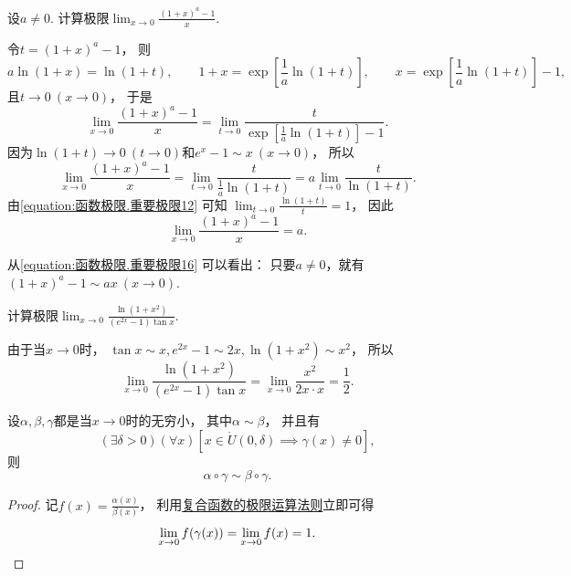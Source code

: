 \begin{example}
设\(a\neq0\).
计算极限\(\lim_{x\to0} \frac{(1+x)^a-1}x\).
\begin{solution}
令\(t = (1+x)^a-1\)，
则\begin{equation*}
	a \ln(1+x) = \ln(1+t),
	\qquad
	1+x=\exp[\frac1a \ln(1+t)],
	\qquad
	x=\exp[\frac1a \ln(1+t)]-1,
\end{equation*}
且\(t\to0\ (x\to0)\)，
于是\begin{equation*}
	\lim_{x\to0} \frac{(1+x)^a-1}x
	= \lim_{t\to0} \frac{t}{\exp[\frac1a \ln(1+t)]-1}.
\end{equation*}
因为\(\ln(1+t)\to0\ (t\to0)\)和\(e^x-1 \sim x\ (x\to0)\)，
所以\begin{equation*}
	\lim_{x\to0} \frac{(1+x)^a-1}x
	= \lim_{t\to0} \frac{t}{\frac1a \ln(1+t)}
	= a \lim_{t\to0} \frac{t}{\ln(1+t)}.
\end{equation*}
由\cref{equation:函数极限.重要极限12} 可知
\(\lim_{t\to0} \frac{\ln(1+t)}{t} = 1\)，
因此\begin{equation}\label{equation:函数极限.重要极限16}
	\lim_{x\to0} \frac{(1+x)^a-1}x
	= a.
\end{equation}
\end{solution}
\end{example}
\begin{remark}
从\cref{equation:函数极限.重要极限16} 可以看出：
只要\(a\neq0\)，就有\((1+x)^a-1 \sim ax\ (x\to0)\).
\end{remark}

\begin{example}
计算极限\(\lim_{x\to0} \frac{\ln(1+x^2)}{(e^{2x}-1) \tan x}\).
\begin{solution}
由于当\(x\to0\)时，
\(\tan x \sim x,
e^{2x}-1 \sim 2x,
\ln(1+x^2) \sim x^2\)，
所以\begin{equation*}
	\lim_{x\to0} \frac{\ln(1+x^2)}{(e^{2x}-1) \tan x}
	= \lim_{x\to0} \frac{x^2}{2x \cdot x}
	= \frac12.
\end{equation*}
\end{solution}
\end{example}

\begin{proposition}[等价无穷小的换元法]\label{theorem:无穷小与无穷大.等价无穷小的换元法}
设\(\alpha,\beta,\gamma\)都是当\(x\to0\)时的无穷小，
其中\(\alpha \sim \beta\)，
并且有\begin{equation*}
	(\exists\delta>0)
	(\forall x)
	[
		x\in\mathring{U}(0,\delta)
		\implies
		\gamma(x) \neq 0
	],
\end{equation*}
则\begin{equation*}
	\alpha\circ\gamma \sim \beta\circ\gamma.
\end{equation*}
\begin{proof}
记\(f(x) = \frac{\alpha(x)}{\beta(x)}\)，
利用\hyperref[theorem:极限.复合函数的极限运算法则1]{复合函数的极限运算法则}立即可得\begin{equation*}
	\lim_{x\to0} f(\gamma(x))
	= \lim_{x\to0} f(x)
	= 1.
	\qedhere
\end{equation*}
\end{proof}
\end{proposition}

